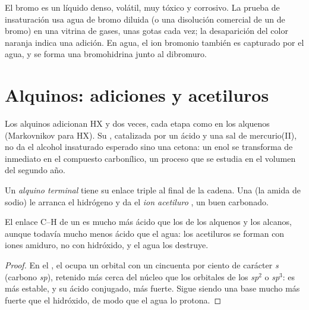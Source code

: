 \begin{inthelab}
El bromo es un líquido denso, volátil, muy tóxico y corrosivo. La prueba
de insaturación usa agua de bromo diluida (o una disolución comercial de
un  de bromo) en una vitrina de gases, unas gotas cada vez; la
desaparición del color naranja indica una adición. En agua, el ion
bromonio también es capturado por el agua, y se forma una bromohidrina
junto al dibromuro.
\end{inthelab}

\section{Alquinos: adiciones y acetiluros}

Los alquinos adicionan HX y  dos veces, cada etapa como en los
alquenos (Markovnikov para HX). Su , catalizada por un ácido y
una sal de mercurio(II), no da el alcohol insaturado esperado sino una
cetona: un enol se transforma de inmediato en el compuesto carbonílico,
un proceso que se estudia en el volumen del segundo año.

\begin{definition}\label{def:b1:electrophilic-additions:acetylide}
Un \emph{alquino terminal}  tiene su
enlace triple al final de la cadena. Una  (la amida de sodio)
le arranca el hidrógeno y da el \emph{ion acetiluro}
, un buen  carbonado.
\end{definition}

\begin{proposition}\label{prop:b1:electrophilic-additions:acetylide-acidity}
El enlace C--H de un  es mucho más ácido que los de los
alquenos y los alcanos, aunque todavía mucho menos ácido que el agua: los
acetiluros se forman con iones amiduro, no con hidróxido, y el agua los
destruye.
\end{proposition}

\begin{proof}
En el , el  ocupa un orbital con un
cincuenta por ciento de carácter \textit{s} (carbono \textit{sp}),
retenido más cerca del núcleo que los orbitales de los 
\textit{sp}$^2$ o \textit{sp}$^3$: es más estable, y su ácido conjugado,
más fuerte. Sigue siendo una base mucho más fuerte que el hidróxido, de
modo que el agua lo protona.
\end{proof}

